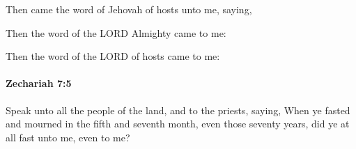 			\begin{versebox}
					\item[BHS] 
					\item[LXX] 
					\item[ASV] Then came the word of Jehovah of hosts unto me, saying,
					\item[NIV] Then the word of the LORD Almighty came to me:
					\item[NRSV] Then the word of the LORD of hosts came to me:
			\end{versebox}

		\paragraph{Zechariah 7:5} %
			\label{ZECHARIAH-7-5}

			Speak unto all the people of the land, and to the priests, saying, When ye fasted and mourned in the fifth and seventh month, even those seventy years, did ye at all fast unto me, even to me?


